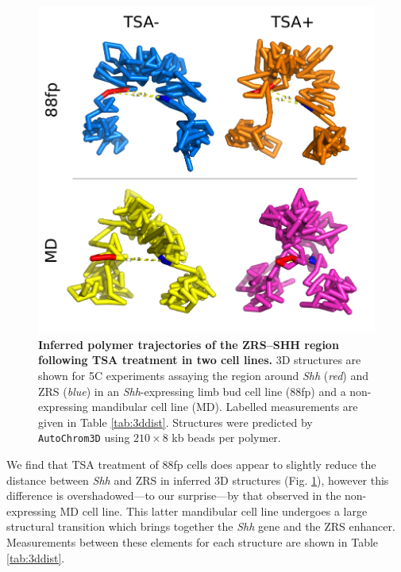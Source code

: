 \documentclass[a4paper,11pt,oneside]{book}
\begin{document}
\begin{figure}
\begin{center} 
\includegraphics[width=5.45in]{figs/5c3d.pdf}
\captionsetup{width=\textwidth} 
\caption[ Inferred polymer trajectories of the ZRS--SHH region following TSA treatment in two cell lines. ]{ {\bf Inferred polymer trajectories of the ZRS--SHH region following TSA treatment in two cell lines. }
3D structures are shown for 5C experiments assaying the region around \emph{Shh} (\emph{red}) and ZRS (\emph{blue}) in an \emph{Shh}-expressing limb bud cell line (88fp) and a non-expressing mandibular cell line (MD). Labelled measurements are given in Table \ref{tab:3ddist}. Structures were predicted by \texttt{AutoChrom3D}\cite{Peng2013} using $210 \times 8$ kb beads per polymer.
}\label{fig:5c3d}
\end{center} 
\end{figure} 

We find that TSA treatment of 88fp cells does appear to slightly reduce the distance between \emph{Shh} and ZRS in inferred 3D structures (Fig. \ref{fig:5c3d}), however this difference is overshadowed---to our surprise---by that observed in the non-expressing MD cell line. This latter mandibular cell line undergoes a large structural transition which brings together the \emph{Shh} gene and the ZRS enhancer. Measurements between these elements for each structure are shown in Table \ref{tab:3ddist}.
\end{document}
